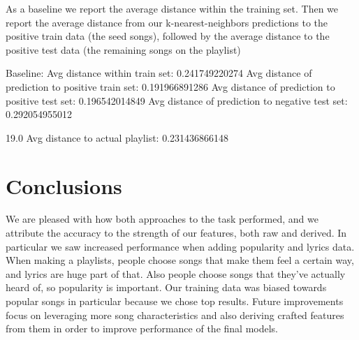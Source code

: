 \documentclass[acmtog]{acmart}
\begin{document}
As a baseline we report the average distance within the training set. Then we report the average distance from our k-nearest-neighbors predictions to the positive train data (the seed songs), followed by the average distance to the positive test data (the remaining songs on the playlist)

Baseline: Avg distance within train set:          0.241749220274
Avg distance of prediction to positive train set: 0.191966891286
Avg distance of prediction to positive test set:  0.196542014849
Avg distance of prediction to negative test set:  0.292054955012

19.0
Avg distance to actual playlist: 0.231436866148

\section{Conclusions}

We are pleased with how both approaches to the task performed, and we attribute the accuracy to the strength of our features, both raw and derived. In particular we saw increased performance when adding popularity and lyrics data. When making a playlists, people choose songs that make them feel a certain way, and lyrics are huge part of that. Also people choose songs that they’ve actually heard of, so popularity is important. Our training data was biased towards popular songs in particular because we chose top results. Future improvements focus on leveraging more song characteristics and also deriving crafted features from them in order to improve performance of the final models.


{}

%
\end{document}

